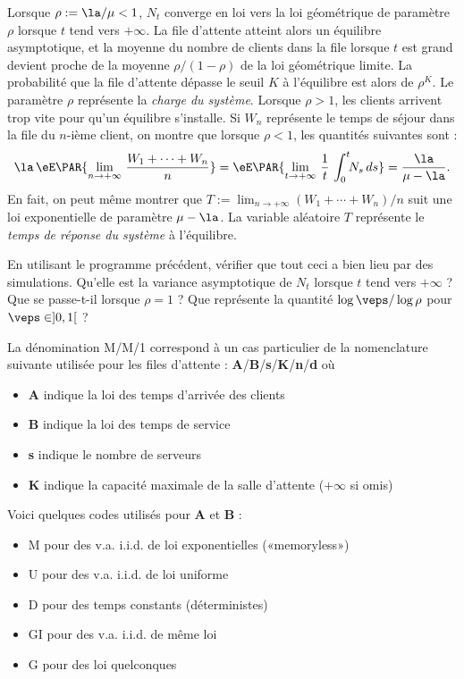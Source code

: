 {{Lorsque $\rho:=\la/\mu<1$, $N_t$ converge en loi vers la loi géométrique de
paramètre $\rho$ lorsque $t$ tend vers $+\infty$. La file d'attente atteint
alors un équilibre asymptotique, et la moyenne du nombre de clients dans la
file lorsque $t$ est grand devient proche de la moyenne $\rho/(1-\rho)$ de la
loi géométrique limite.  La probabilité que la file d'attente dépasse le seuil
$K$ à l'équilibre est alors de $\rho^K$. Le paramètre $\rho$ représente la
\emph{charge du système}. Lorsque $\rho>1$, les clients arrivent trop vite
pour qu'un équilibre s'installe. Si $W_n$ représente le temps de séjour dans
la file du $n$-ième client, on montre que lorsque $\rho<1$, les quantités
suivantes sont  :
$$
\la\,\eE\PAR{\lim_{n\to+\infty}\,\frac{W_1+\cdots+W_n}{n}}
=\eE\PAR{\lim_{t\to+\infty}\,\frac{1}{t}\,\int_0^t\!\!N_s\,ds}
=\frac{\la}{\mu-\la}.
$$
En fait, on peut même montrer que
$T:=\lim_{n\to+\infty}(W_1+\cdots+W_n)/n$ suit une loi exponentielle
de paramètre $\mu-\la$. La variable aléatoire $T$ représente le
\emph{temps de réponse du système} à l'équilibre.

\begin{exo}
  En utilisant le programme \ML{} précédent, vérifier que tout ceci a
  bien lieu par des simulations. Qu'elle est la variance asymptotique
  de $N_t$ lorsque $t$ tend vers $+\infty$ ?  Que se passe-t-il
  lorsque $\rho=1$ ?  Que représente la quantité $\log \veps / \log
  \rho$ pour $\veps \in]0,1[$ ?
\end{exo}

La dénomination M/M/1 correspond à un cas particulier de la
nomenclature suivante utilisée pour les files d'attente :
\textbf{A}/\textbf{B}/\textbf{s}/\textbf{K}/\textbf{n}/\textbf{d} où
\begin{itemize}
\item \textbf{A} indique la loi des temps d'arrivée des clients
\item \textbf{B} indique la loi des temps de service
\item \textbf{s} indique le nombre de serveurs
\item \textbf{K} indique la capacité maximale de la salle d'attente ($+\infty$ si
  omis)
\end{itemize}
Voici quelques codes utilisés pour \textbf{A} et \textbf{B} :
\begin{itemize}
\item M pour des v.a. i.i.d. de loi exponentielles («memoryless»)
\item U pour des v.a. i.i.d. de loi uniforme
\item D pour des temps constants (déterministes)
\item GI pour des v.a. i.i.d. de même loi
\item G pour des loi quelconques
\end{itemize}

}}

